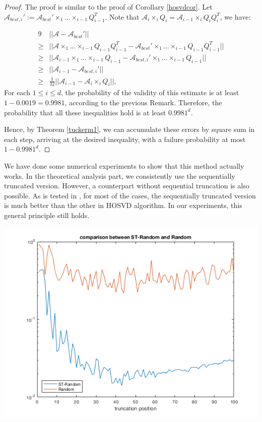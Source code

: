 \documentclass[12pt]{article}
\begin{document}
\begin{proof}
The proof is similar to the proof of Corollary \ref{hosvdcor}.
Let $\mathcal{A}_{best,i}' := \mathcal{A}_{best}' \times_1 \dots \times_{i-1} Q_{i-1}^T$. Note that $\mathcal{A}_i \times_i Q_i = \mathcal{A}_{i-1} \times_i Q_iQ_i^T$, we have:

 \begin{alignat*}{9}
& || \mathcal{A} - \mathcal{A}_{best}' || \\
 \geq & || \mathcal{A} \times_1 \dots \times_{i-1} Q_{i-1}Q_{i-1}^T - \mathcal{A}_{best}' \times_1 \dots \times_{i-1} Q_{i-1}Q_{i-1}^T || \\
 \geq & || \mathcal{A}_{i-1} \times_1 \dots \times_{i-1} Q_{i-1} - \mathcal{A}_{best, i}' \times_1 \dots \times_{i-1} Q_{i-1} || \\
 \geq & || \mathcal{A}_{i-1} - \mathcal{A}_{best,i}' || \\
 \geq & \frac{1}{32} || \mathcal{A}_{i-1} - \mathcal{A}_{i} \times_i Q_i ||,
\end{alignat*}
For each $1 \leq i \leq d$, the probability of the validity of this estimate is at least $1 - 0.0019 = 0.9981$, according to the previous Remark. Therefore, the probability that all these inequalities hold is at least $0.9981^d$.

Hence, by Theorem \ref{tuckerm1}, we can accumulate these errors by square sum in each step, arriving at the desired inequality, with a failure probability at most $1 - 0.9981^d$.
\end{proof}

We have done some numerical experiments to show that this method actually works. In the theoretical analysis part, we consistently use the sequentially truncated version. However, a counterpart without sequential truncation is also possible. As is tested in \cite{trunctucker}, for most of the cases, the sequentially truncated version is much better than the other in HOSVD algorithm. In our experiments, this general principle still holds.

\centerline{\includegraphics[scale=0.7]{tensorRandom}}
\end{document}
